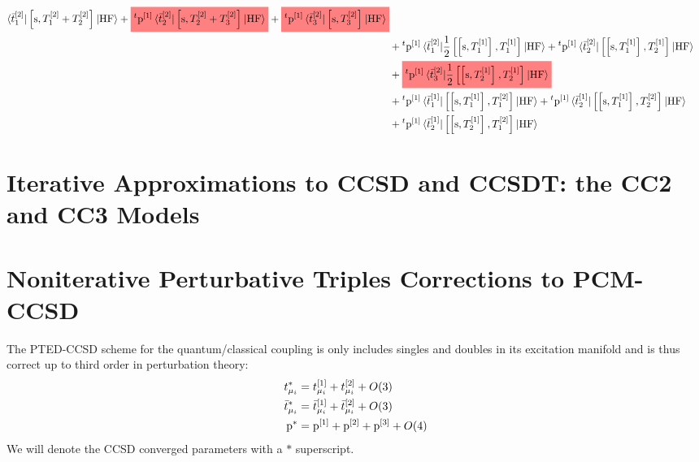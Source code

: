 \begin{equation}
\begin{aligned}
    \braket{\tbar{1}^{[2]} | \commutator{\s}{T_1^{[2]} + T_2^{[2]}} | \mathrm{HF}}
    +
    \highlight{red}{
    {}^t\p^{[1]}
    \braket{\tbar{2}^{[2]} | \commutator{\s}{T_2^{[2]} + T_3^{[2]}} | \mathrm{HF}}
    }
    +
    \highlight{red}{
    {}^t\p^{[1]}
    \braket{\tbar{3}^{[2]} | \commutator{\s}{T_3^{[2]}} | \mathrm{HF}}
    } \\
    &+
    {}^t\p^{[1]}
    \braket{\tbar{1}^{[2]} |
    \frac{1}{2}\commutator{\commutator{\s}{T_1^{[1]}}}{T_1^{[1]}}
    | \mathrm{HF}}
    +
    {}^t\p^{[1]}
    \braket{\tbar{2}^{[2]} |
    \commutator{\commutator{\s}{T_1^{[1]}}}{T_2^{[1]}}
    | \mathrm{HF}} \\
    &+
    \highlight{red}{
    {}^t\p^{[1]}
    \braket{\tbar{3}^{[2]} |
    \frac{1}{2}\commutator{\commutator{\s}{T_2^{[1]}}}{T_2^{[1]}}
    | \mathrm{HF}}
    } \\
    &+ {}^t\p^{[1]}
    \braket{\tbar{1}^{[1]} |
    \commutator{\commutator{\s}{T_1^{[1]}}}{T_1^{[2]}}
    | \mathrm{HF}}
    + {}^t\p^{[1]}
    \braket{\tbar{2}^{[1]} |
    \commutator{\commutator{\s}{T_1^{[1]}}}{T_2^{[2]}}
    | \mathrm{HF}} \\
    &+ {}^t\p^{[1]}
    \braket{\tbar{2}^{[1]} |
    \commutator{\commutator{\s}{T_2^{[1]}}}{T_1^{[2]}}
    | \mathrm{HF}}
  \end{aligned}
\end{equation}

\section[Iterative Approximations: CC2 and CC3]{Iterative Approximations to CCSD and CCSDT: the CC2 and CC3 Models}\label{sec:cc2-and-cc3}

\section[Noniterative Triples Corrections to PCM-CCSD]{
Noniterative Perturbative Triples Corrections to PCM-CCSD}\label{sec:ccsd-t-noniterative}

The \acrshort{PTED}-\acrshort{CCSD} scheme for the quantum/classical coupling is
only includes singles and doubles in its excitation manifold and is thus
correct up to third order in perturbation theory:
\begin{subequations}
  \begin{align}
    t_{\mu_i}^{*} &= t_{\mu_i}^{[1]} + t_{\mu_i}^{[2]} + O(3)
    \label{eq:tamp-star} \\
    \bar{t}_{\mu_i}^{*} &= \bar{t}_{\mu_i}^{[1]} + \bar{t}_{\mu_i}^{[2]} + O(3)
    \label{eq:tbar-star} \\
    \mathrm{p}^{*} &= \mathrm{p}^{[1]} + \mathrm{p}^{[2]} + \mathrm{p}^{[3]} + O(4)
    \label{eq:p-star}
  \end{align}
\end{subequations}
We will denote the \acrshort{CCSD} converged parameters with a $*$ superscript.

